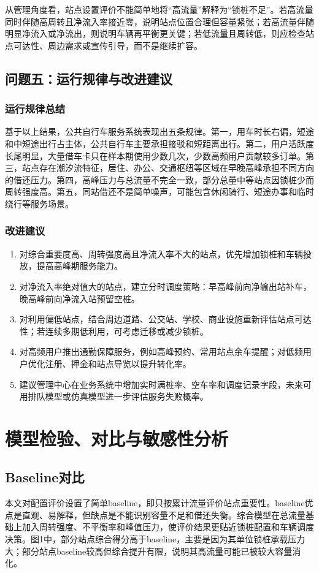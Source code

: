 \documentclass[UTF8,a4paper,12pt]{ctexart}
\begin{document}
从管理角度看，站点设置评价不能简单地将“高流量”解释为“锁桩不足”。若高流量同时伴随高周转且净流入率接近零，说明站点位置合理但容量紧张；若高流量伴随明显净流入或净流出，则说明车辆再平衡更关键；若低流量且周转低，则应检查站点可达性、周边需求或宣传引导，而不是继续扩容。

\subsection{问题五：运行规律与改进建议}
\subsubsection{运行规律总结}
基于以上结果，公共自行车服务系统表现出五条规律。第一，用车时长右偏，短途和中短途出行占主体，公共自行车主要承担接驳和短距离出行。第二，用户活跃度长尾明显，大量借车卡只在样本期使用少数几次，少数高频用户贡献较多订单。第三，站点存在潮汐流特征，居住、办公、交通枢纽等区域在早晚高峰承担不同方向的借还压力。第四，高峰压力与总流量不完全一致，部分总量中等站点因锁桩少而周转强度高。第五，同站借还不是简单噪声，可能包含休闲骑行、短途办事和临时绕行等服务场景。

\subsubsection{改进建议}
\begin{enumerate}[itemsep=0.4em]
  \item 对综合重要度高、周转强度高且净流入率不大的站点，优先增加锁桩和车辆投放，提高高峰期服务能力。
  \item 对净流入率绝对值大的站点，建立分时调度策略：早高峰前向净输出站补车，晚高峰前向净流入站预留空桩。
  \item 对利用偏低站点，结合周边道路、公交站、学校、商业设施重新评估站点可达性；若连续多期低利用，可考虑迁移或减少锁桩。
  \item 对高频用户推出通勤保障服务，例如高峰预约、常用站点余车提醒；对低频用户优化注册、押金和站点导览以提升转化率。
  \item 建议管理中心在业务系统中增加实时满桩率、空车率和调度记录字段，未来可用排队模型或仿真模型进一步评估服务失败概率。
\end{enumerate}

\section{模型检验、对比与敏感性分析}
\subsection{Baseline对比}
本文对配置评价设置了简单baseline，即只按累计流量评价站点重要性。baseline优点是直观、易解释，但缺点是不能识别容量不足和借还失衡。综合模型在总流量基础上加入周转强度、不平衡率和峰值压力，使评价结果更贴近锁桩配置和车辆调度决策。图1中，部分站点综合得分高于baseline，主要是因为其单位锁桩承载压力大；部分站点baseline较高但综合提升有限，说明其高流量可能已被较大容量消化。
\end{document}
